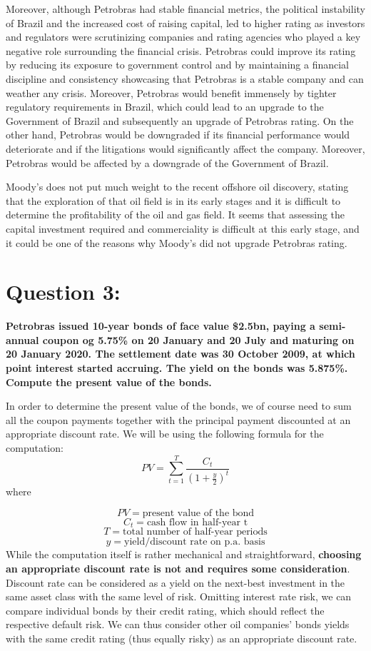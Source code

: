 \documentclass[
]{article}
\begin{document}
Moreover, although Petrobras had stable financial metrics, the political
instability of Brazil and the increased cost of raising capital, led to
higher rating as investors and regulators were scrutinizing companies
and rating agencies who played a key negative role surrounding the
financial crisis. Petrobras could improve its rating by reducing its
exposure to government control and by maintaining a financial discipline
and consistency showcasing that Petrobras is a stable company and can
weather any crisis. Moreover, Petrobras would benefit immensely by
tighter regulatory requirements in Brazil, which could lead to an
upgrade to the Government of Brazil and subsequently an upgrade of
Petrobras rating. On the other hand, Petrobras would be downgraded if
its financial performance would deteriorate and if the litigations would
significantly affect the company. Moreover, Petrobras would be affected
by a downgrade of the Government of Brazil.

Moody's does not put much weight to the recent offshore oil discovery,
stating that the exploration of that oil field is in its early stages
and it is difficult to determine the profitability of the oil and gas
field. It seems that assessing the capital investment required and
commerciality is difficult at this early stage, and it could be one of
the reasons why Moody's did not upgrade Petrobras rating.

\hypertarget{question-3}{%
\section{Question 3:}\label{question-3}}

\textbf{Petrobras issued 10-year bonds of face value \$2.5bn, paying a
semi-annual coupon og 5.75\% on 20 January and 20 July and maturing on
20 January 2020. The settlement date was 30 October 2009, at which point
interest started accruing. The yield on the bonds was 5.875\%. Compute
the present value of the bonds.}

In order to determine the present value of the bonds, we of course need
to sum all the coupon payments together with the principal payment
discounted at an appropriate discount rate. We will be using the
following formula for the computation: \[
PV=\sum_{t=1}^{T} \frac{C_{t}}{(1+\frac{y}{2})^{t}}
\] where

\[
PV = \text{present value of the bond}
\] \[
C_t = \text{cash flow in half-year t}
\] \[
T = \text{total number of half-year periods}
\] \[
y = \text{yield/discount rate on p.a. basis}
\] While the computation itself is rather mechanical and
straightforward, \textbf{choosing an appropriate discount rate is not
and requires some consideration}. Discount rate can be considered as a
yield on the next-best investment in the same asset class with the same
level of risk. Omitting interest rate risk, we can compare individual
bonds by their credit rating, which should reflect the respective
default risk. We can thus consider other oil companies' bonds yields
with the same credit rating (thus equally risky) as an appropriate
discount rate.
\end{document}
